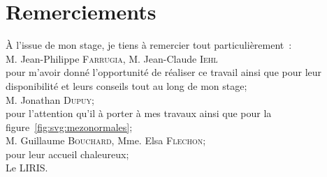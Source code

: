\documentclass[10pt,a4paper,twoside, twocolumn]{report}
\begin{document}
{}
\section*{Remerciements}



\begin{center}

  \vspace{5cm}
  À l'issue de mon stage, je tiens à remercier tout particulièrement~:\\
  \vspace{1cm}	
  M. Jean-Philippe \textsc{Farrugia}, M. Jean-Claude \textsc{Iehl}\\
  pour m'avoir donné l'opportunité de réaliser ce travail ainsi que pour leur disponibilité et leurs conseils tout au long de mon stage;\\
  \vspace{1cm}
  M. Jonathan \textsc{Dupuy};\\
  pour l'attention qu'il à porter à mes travaux ainsi que pour la figure~\ref{fig:svg:mezonormales};\\
	\vspace{1cm}
  M. Guillaume \textsc{Bouchard}, Mme. Elsa \textsc{Flechon};\\
  pour leur accueil chaleureux;\\
  \vspace{1cm}
  Le LIRIS.
\end{center}
\end{document}
